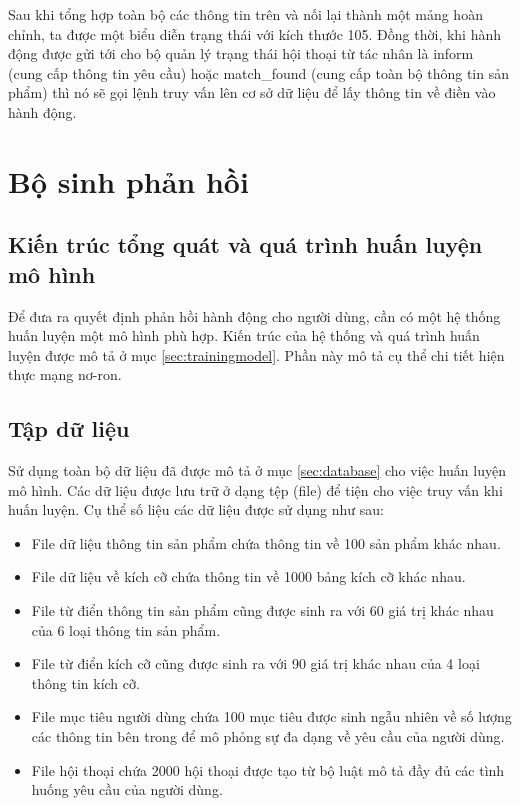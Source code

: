 Sau khi tổng hợp toàn bộ các thông tin trên và nối lại thành một mảng
hoàn chỉnh, ta được một biểu diễn trạng thái với kích thước 105.
Đồng thời, khi hành động được gửi tới cho bộ quản lý trạng thái
hội thoại từ tác nhân là inform (cung cấp thông tin yêu cầu) hoặc
match\_found (cung cấp toàn bộ thông tin sản phẩm) thì nó sẽ gọi lệnh
truy vấn lên cơ sở dữ liệu để lấy thông tin về điền vào hành động.

\section{Bộ sinh phản hồi}
\label{sec:agentresponse}

\subsection{Kiến trúc tổng quát và quá trình huấn luyện mô hình}
Để đưa ra quyết định phản hồi hành động cho người dùng, cần có một
hệ thống huấn luyện một mô hình phù hợp. Kiến trúc của hệ thống và
quá trình huấn luyện được mô tả ở mục \ref{sec:trainingmodel}.
Phần này mô tả cụ thể chi tiết hiện thực mạng nơ-ron.

\subsection{Tập dữ liệu}
Sử dụng toàn bộ dữ liệu đã được mô tả ở mục \ref{sec:database}
cho việc huấn luyện mô hình. Các dữ liệu được lưu trữ ở dạng tệp
(file) để tiện cho việc truy vấn khi huấn luyện. Cụ thể số liệu
các dữ liệu được sử dụng như sau:

\begin{itemize}
    \item File dữ liệu thông tin sản phẩm chứa thông tin về 100
    sản phẩm khác nhau.
    \item File dữ liệu về kích cỡ chứa thông tin về 1000 bảng
    kích cỡ khác nhau.
    \item File từ điển thông tin sản phẩm cũng được sinh ra với
    60 giá trị khác nhau của 6 loại thông tin sản phẩm.
    \item File từ điển kích cỡ cũng được sinh ra với 90 giá trị
    khác nhau của 4 loại thông tin kích cỡ.
    \item File mục tiêu người dùng chứa 100 mục tiêu được sinh
    ngẫu nhiên về số lượng các thông tin bên trong để mô phỏng
    sự đa dạng về yêu cầu của người dùng.
    \item File hội thoại chứa 2000 hội thoại được tạo từ bộ luật
    mô tả đầy đủ các tình huống yêu cầu của người dùng.
\end{itemize}

